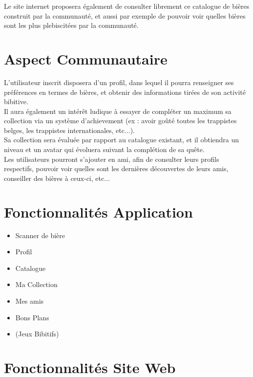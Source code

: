 \documentclass{report}
\begin{document}
		Le site internet proposera également de consulter librement ce catalogue de bières construit par la communauté, et aussi par exemple de pouvoir voir quelles bières sont les plus plebiscitées par la communauté.\\

	\section{Aspect Communautaire}

		L'utilisateur inscrit disposera d'un profil, dans lequel il pourra renseigner ses préférences en termes de bières, et obtenir des informations tirées de son activité bibitive.\\

		Il aura également un intérêt ludique à essayer de compléter un maximum sa collection via un système d'achievement (ex : avoir goûté toutes les trappistes belges, les trappistes internationales, etc...).\\
		Sa collection sera évaluée par rapport au catalogue existant, et il obtiendra un niveau et un avatar qui évoluera suivant la complétion de sa quête.\\

		Les utilisateurs pourront s'ajouter en ami, afin de consulter leurs profils respectifs, pouvoir voir quelles sont les dernières découvertes de leurs amis, conseiller des bières à ceux-ci, etc...\\

	\section{Fonctionnalités Application}

		\begin{itemize}
			\item Scanner de bière
			\item Profil
			\item Catalogue
			\item Ma Collection
			\item Mes amis
			\item Bons Plans
			\item (Jeux Bibitifs)
		\end{itemize}

	\section{Fonctionnalités Site Web}
\end{document}
